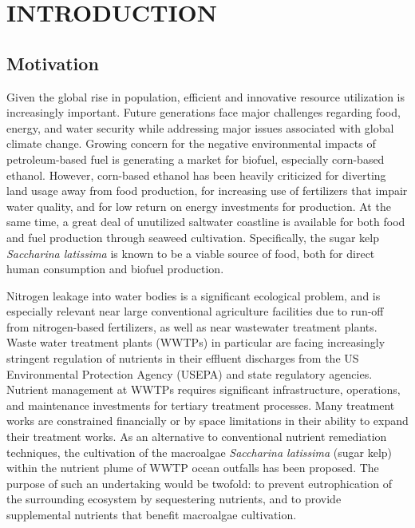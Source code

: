 \chapter{INTRODUCTION} \label{ch:intro}

\section{Motivation}
  Given the global rise in population, efficient and innovative resource utilization is increasingly important.
Future generations face major challenges regarding food, energy, and water security while addressing major issues associated with global climate change.
Growing concern for the negative environmental impacts of petroleum-based fuel is generating a market for biofuel, especially corn-based ethanol.
However, corn-based ethanol has been heavily criticized for diverting land usage away from food production, for increasing use of fertilizers that impair water quality, and for low return on energy investments for production.
At the same time, a great deal of unutilized saltwater coastline is available for both food and fuel production through seaweed cultivation.
Specifically, the sugar kelp \textit{Saccharina latissima} is known to be a viable source of food,  both for direct human consumption and biofuel production.

Nitrogen leakage into water bodies is a significant ecological problem, and is especially relevant near large conventional agriculture facilities due to run-off from nitrogen-based fertilizers, as well as near wastewater treatment plants.
Waste water treatment plants (WWTPs) in particular are facing increasingly stringent regulation of nutrients in their effluent discharges from the US Environmental Protection Agency (USEPA) and state regulatory agencies.
Nutrient management at WWTPs requires significant infrastructure, operations, and maintenance investments for tertiary treatment processes. Many treatment works are constrained financially or by space limitations in their ability to expand their treatment works.
As an alternative to conventional nutrient remediation techniques, the cultivation of the macroalgae \textit{Saccharina latissima} (sugar kelp) within the nutrient plume of WWTP ocean outfalls has been proposed.
The purpose of such an undertaking would be twofold: to prevent eutrophication of the surrounding ecosystem by sequestering nutrients, and to provide supplemental nutrients that benefit macroalgae cultivation. %

